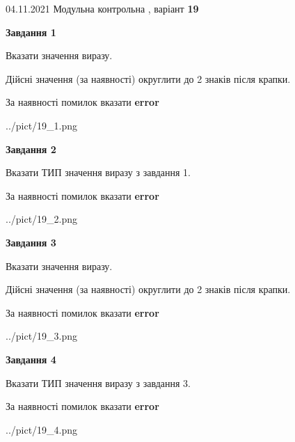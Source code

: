 \documentclass[11pt, ukrainian]{article}
\begin{document}
{04.11.2021 Модульна контрольна , варіант  \No \textbf { 19 }\par}
{
\begin {large}
{\begin {center}\textbf{Завдання 1}\end {center}}\par
Вказати значення виразу. \par
Дійсні значення (за наявності) округлити до 2 знаків після крапки. \par
За наявності помилок вказати \textbf{error}

\begin{center}
	{../pict/19_1.png}
\end{center}
\newpage

{\begin {center}\textbf{Завдання 2}\end {center}}\par
Вказати ТИП значення виразу з завдання 1. \par
За наявності помилок вказати \textbf{error}

\begin{center}
	{../pict/19_2.png}
\end{center}
\newpage

{\begin {center}\textbf{Завдання 3}\end {center}}\par
Вказати значення виразу. \par
Дійсні значення (за наявності) округлити до 2 знаків після крапки. \par
За наявності помилок вказати \textbf{error}

\begin{center}
	{../pict/19_3.png}
\end{center}
\newpage

{\begin {center}\textbf{Завдання 4}\end {center}}\par
Вказати ТИП значення виразу з завдання 3. \par
За наявності помилок вказати \textbf{error}

\begin{center}
	{../pict/19_4.png}
\end{center}
\newpage


\end{large}}
\end{document}
